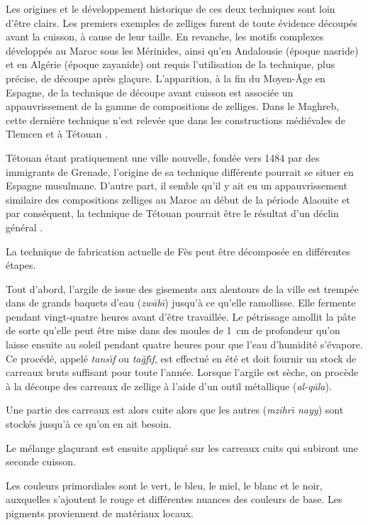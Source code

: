 Les origines et le développement historique de ces deux techniques 
sont loin d'être clairs. Les premiers exemples de zelliges 
 furent 
de toute évidence découpés avant la cuisson, à cause de leur taille. 
En revanche, les motifs complexes développés au Maroc sous les 
Mérinides, ainsi qu'en Andalousie (époque nasride) et en Algérie 
(époque zayanide) ont requis l'utilisation de la technique, plus 
précise, de découpe après glaçure. L'apparition, à la fin du Moyen-Âge 
en Espagne, de la technique de découpe avant cuisson est associée un 
appauvrissement de la gamme de compositions de zelliges. Dans le 
Maghreb, cette dernière technique n'est relevée que dans les 
constructions médiévales de Tlemcen et à Tétouan 
\autocite{Erzini_1993a}.

Tétouan étant pratiquement une ville nouvelle, fondée vers 1484 
par des immigrants de Grenade, l'origine de sa technique différente 
pourrait se situer en Espagne musulmane. D'autre part, il semble 
qu'il y ait eu un appauvrissement similaire des compositions zelliges 
au Maroc au début de la période Alaouite et par conséquent, la 
technique de Tétouan pourrait être le résultat d'un déclin général 
\autocite{Erzini_1993b}.

La technique de fabrication actuelle de Fès peut être décomposée en 
différentes étapes.

Tout d'abord, l'argile de  issue des gisements aux 
alentours de la ville est trempée dans de grands baquets d'eau 
(\emph{zw\={a}b\={\i}}) jusqu'à ce qu'elle ramollisse. 
Elle fermente pendant vingt-quatre heures avant d'être travaillée. 
Le pétrissage amollit la pâte de sorte qu'elle peut être mise dans 
des moules de \SI{1}{\cm} de profondeur qu'on laisse ensuite au soleil 
pendant quatre heures pour que l'eau d'humidité s'évapore. 
Ce procédé, appelé \emph{tans\u{\i}f} ou \emph{ta\u{g}f\={\i}f}, est 
effectué en été et doit fournir un stock de carreaux bruts suffisant 
pour toute l'année. 
Lorsque l'argile est sèche, on procède à la découpe des carreaux de 
zellige à l'aide d'un outil métallique (\emph{al-q\={a}la}).

Une partie des carreaux est alors cuite alors que les autres 
(\emph{mzihr\={\i} nayy}) sont stockés jusqu'à ce qu'on en ait besoin.

Le mélange glaçurant est ensuite appliqué sur les carreaux cuits qui 
subiront une seconde cuisson.

Les couleurs primordiales sont le vert, le bleu, le miel, le blanc 
et le noir, auxquelles s'ajoutent le rouge et différentes nuances 
des couleurs de base. Les pigments proviennent de matériaux locaux.

